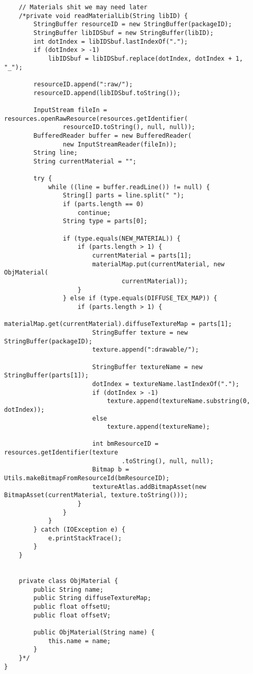 \begin{lstlisting}
	// Materials shit we may need later
	/*private void readMaterialLib(String libID) {
		StringBuffer resourceID = new StringBuffer(packageID);
		StringBuffer libIDSbuf = new StringBuffer(libID);
		int dotIndex = libIDSbuf.lastIndexOf(".");
		if (dotIndex > -1)
			libIDSbuf = libIDSbuf.replace(dotIndex, dotIndex + 1, "_");

		resourceID.append(":raw/");
		resourceID.append(libIDSbuf.toString());

		InputStream fileIn = resources.openRawResource(resources.getIdentifier(
				resourceID.toString(), null, null));
		BufferedReader buffer = new BufferedReader(
				new InputStreamReader(fileIn));
		String line;
		String currentMaterial = "";

		try {
			while ((line = buffer.readLine()) != null) {
				String[] parts = line.split(" ");
				if (parts.length == 0)
					continue;
				String type = parts[0];

				if (type.equals(NEW_MATERIAL)) {
					if (parts.length > 1) {
						currentMaterial = parts[1];
						materialMap.put(currentMaterial, new ObjMaterial(
								currentMaterial));
					}
				} else if (type.equals(DIFFUSE_TEX_MAP)) {
					if (parts.length > 1) {
						materialMap.get(currentMaterial).diffuseTextureMap = parts[1];
						StringBuffer texture = new StringBuffer(packageID);
						texture.append(":drawable/");

						StringBuffer textureName = new StringBuffer(parts[1]);
						dotIndex = textureName.lastIndexOf(".");
						if (dotIndex > -1)
							texture.append(textureName.substring(0, dotIndex));
						else
							texture.append(textureName);

						int bmResourceID = resources.getIdentifier(texture
								.toString(), null, null);
						Bitmap b = Utils.makeBitmapFromResourceId(bmResourceID);
						textureAtlas.addBitmapAsset(new BitmapAsset(currentMaterial, texture.toString()));
					}
				}
			}
		} catch (IOException e) {
			e.printStackTrace();
		}
	}
	
	
	private class ObjMaterial {
		public String name;
		public String diffuseTextureMap;
		public float offsetU;
		public float offsetV;

		public ObjMaterial(String name) {
			this.name = name;
		}
	}*/
}
\end{lstlisting}

